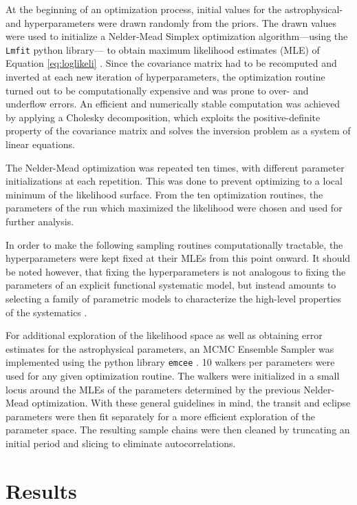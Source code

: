 \documentclass[twocolumn]{aastex61}
\begin{document}
At the beginning of an optimization process, initial values for the astrophysical- and hyperparameters were drawn randomly from the priors. The drawn values were used to initialize a Nelder-Mead Simplex optimization algorithm---using the \texttt{Lmfit} python library--- to obtain maximum likelihood estimates (MLE) of Equation \ref{eq:loglikeli} \citep{neldermead1965, lmfit2014}. Since the covariance matrix had to be recomputed and inverted at each new iteration of hyperparameters, the optimization routine turned out to be computationally expensive and was prone to over- and underflow errors. An efficient and numerically stable computation was achieved  by applying a Cholesky decomposition, which exploits the positive-definite property of the covariance matrix and solves the inversion problem as a system of linear equations.

The Nelder-Mead optimization was repeated ten times, with different parameter initializations at each repetition. This was done to prevent optimizing to a local minimum of the likelihood surface. From the ten optimization routines, the parameters of the run which maximized the likelihood were chosen and used for further analysis.

In order to make the following sampling routines computationally tractable, the hyperparameters were kept fixed at their MLEs from this point onward. It should be noted however, that fixing the hyperparameters is not analogous to fixing the parameters of an explicit functional systematic model, but instead amounts to selecting a family of parametric models to characterize the high-level properties of the systematics \citep{evans2015}.

For additional exploration of the likelihood space as well as obtaining error estimates for the astrophysical parameters, an MCMC Ensemble Sampler was implemented using the python library \texttt{emcee} \citep{foreman2013,goodman2010}. 10 walkers per parameters were used for any given optimization routine. The walkers were initialized in a small locus around the MLEs of the parameters determined by the previous Nelder-Mead optimization. With these general guidelines in mind, the transit and eclipse parameters were then fit separately for a more efficient exploration of the parameter space. The resulting sample chains were then cleaned by truncating an initial period and slicing to eliminate autocorrelations.

\section{Results}
\end{document}
